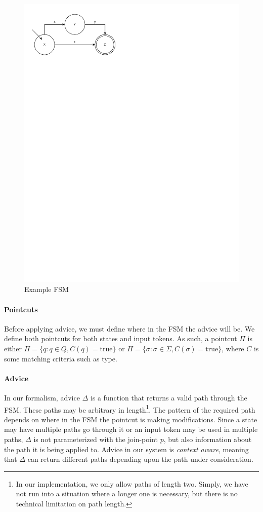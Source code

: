 \documentclass[sigplan,anonymous,review]{acmart}
\begin{document}
\begin{figure}[h]
    \centering
    \includegraphics{figures/ExampleFSM.pdf}
    \caption{Example FSM}
    \label{fig:example}
\end{figure}

\paragraph{Pointcuts} Before applying advice, we must define where in the FSM the advice will be. We define both pointcuts for both states and input tokens. As such, a pointcut $\Pi$ is either $\Pi = \{q : q \in Q, C(q) = \mathrm{true}\}$ or $\Pi = \{\sigma : \sigma \in \Sigma, C(\sigma) = \mathrm{true}\}$, where $C$ is some matching criteria such as type.

\paragraph{Advice} In our formalism, advice $\Delta$ is a function that returns a valid path through the FSM. These paths may be arbitrary in length\footnote{In our implementation, we only allow paths of length two. Simply, we have not run into a situation where a longer one is necessary, but there is no technical limitation on path length.}. The pattern of the required path depends on where in the FSM the pointcut is making modifications. Since a state may have multiple paths go through it or an input token may be used in multiple paths, $\Delta$ is not parameterized with the join-point $p$, but also information about the path it is being applied to. Advice in our system is \emph{context aware}, meaning that $\Delta$ can return different paths depending upon the path under consideration. 
\end{document}
